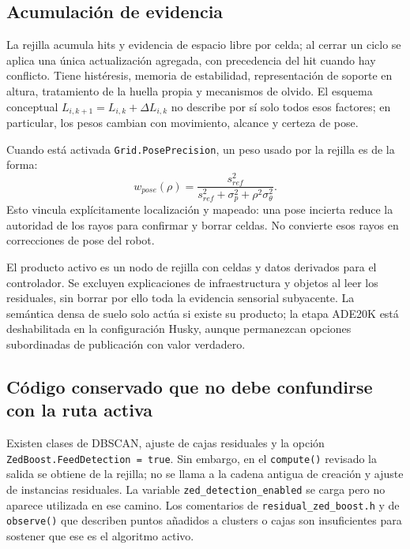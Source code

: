 \documentclass[11pt,a4paper]{article}
\newcommand{\code}[1]{\nolinkurl{#1}}
\begin{document}
\subsection{Acumulación de evidencia}
La rejilla acumula hits y evidencia de espacio libre por celda; al cerrar un ciclo
se aplica una única actualización agregada, con precedencia del hit cuando hay
conflicto. Tiene histéresis, memoria de estabilidad, representación de soporte en
altura, tratamiento de la huella propia y mecanismos de olvido. El esquema
conceptual $L_{i,k+1}=L_{i,k}+\Delta L_{i,k}$ no describe por sí solo todos esos
factores; en particular, los pesos cambian con movimiento, alcance y certeza de pose.
\cite{grid,resworker}

Cuando está activada \code{Grid.PosePrecision}, un peso usado por la rejilla es de
la forma:
\begin{equation}
 w_{pose}(\rho)=\frac{s_{ref}^2}{s_{ref}^2+\sigma_p^2+\rho^2\sigma_\theta^2}.
\end{equation}
Esto vincula explícitamente localización y mapeado: una pose incierta reduce la
autoridad de los rayos para confirmar y borrar celdas. No convierte esos rayos en
correcciones de pose del robot.~\cite{grid,resworker}

El producto activo es un nodo de rejilla con celdas y datos derivados para el
controlador. Se excluyen explicaciones de infraestructura y objetos al leer los
residuales, sin borrar por ello toda la evidencia sensorial subyacente. La semántica
densa de suelo solo actúa si existe su producto; la etapa ADE20K está deshabilitada
en la configuración Husky, aunque permanezcan opciones subordinadas de publicación
con valor verdadero.~\cite{resworker,retinaworker,retinaconfig}

\subsection{Código conservado que no debe confundirse con la ruta activa}
Existen clases de DBSCAN, ajuste de cajas residuales y la opción
\code{ZedBoost.FeedDetection = true}. Sin embargo, en el \code{compute()} revisado
la salida se obtiene de la rejilla; no se llama a la cadena antigua de creación y
ajuste de instancias residuales. La variable \code{zed_detection_enabled} se carga
pero no aparece utilizada en ese camino. Los comentarios de
\code{residual_zed_boost.h} y de \code{observe()} que describen puntos añadidos a
clusters o cajas son insuficientes para sostener que ese es el algoritmo activo.
\cite{resworker,resconfigloader,zedboost}
\end{document}
